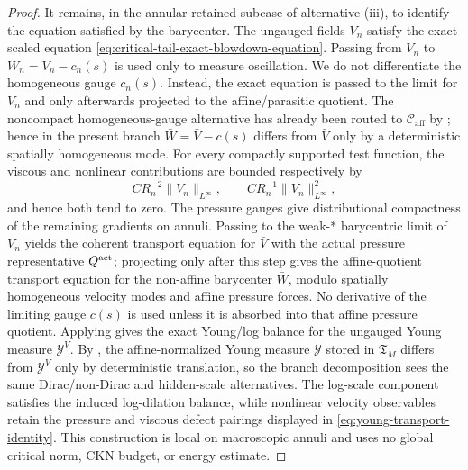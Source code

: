 \documentclass[11pt]{amsart}
\numberwithin{equation}{section}
\theoremstyle{plain}
\theoremstyle{definition}
\theoremstyle{remark}
\newcommand{\Caff}{\mathcal C_{\mathrm{aff}}}
\newcommand{\Tcrit}{\mathfrak T_M}
\begin{document}
\begin{proof}
It remains, in the annular retained subcase of alternative \textup{(iii)}, to
identify the equation satisfied by the barycenter.  The ungauged
fields \(V_n\) satisfy the exact scaled equation
\eqref{eq:critical-tail-exact-blowdown-equation}.  Passing from \(V_n\) to
\(W_n=V_n-c_n(s)\) is used only to measure oscillation.  We do not differentiate
the homogeneous gauge \(c_n(s)\).  Instead, the exact equation is passed to the
limit for \(V_n\) and only afterwards projected to the affine/parasitic
quotient.  The noncompact homogeneous-gauge alternative has already been routed
to \(\Caff\) by ; hence in the
present branch \(\bar W=\bar V-c(s)\) differs from \(\bar V\) only by a
deterministic spatially homogeneous mode.
For every compactly supported test function, the viscous and nonlinear
contributions are bounded respectively by
\[
   CR_n^{-2}\|V_n\|_{L^\infty},
   \qquad
   CR_n^{-1}\|V_n\|_{L^\infty}^2 ,
\]
and hence both tend to zero.  The pressure gauges give distributional
compactness of the remaining gradients on annuli.  Passing to the weak-*
barycentric limit of \(V_n\) yields the coherent transport equation for
\(\bar V\) with the actual pressure representative \(Q^{\rm act}\); projecting
only after this step gives the affine-quotient transport equation for the
non-affine barycenter \(\bar W\), modulo spatially homogeneous velocity modes
and affine pressure forces.  No derivative of the limiting gauge \(c(s)\) is
used unless it is absorbed into that affine pressure quotient.  Applying
 gives the exact Young/log balance
for the ungauged Young measure \(\mathcal Y^V\).  By
, the affine-normalized Young
measure \(\mathcal Y\) stored in \(\Tcrit\) differs from \(\mathcal Y^V\) only
by deterministic translation, so the branch decomposition sees the same
Dirac/non-Dirac and hidden-scale alternatives.  The log-scale component
satisfies the induced log-dilation balance, while nonlinear velocity
observables retain the pressure and viscous defect pairings displayed in
\eqref{eq:young-transport-identity}.  This construction is local on
macroscopic annuli and uses no global critical norm, CKN budget, or energy
estimate.
\end{proof}
\end{document}
